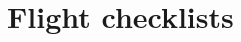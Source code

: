 \documentclass[Orbiter User Manual.tex]{subfiles}
\begin{document}
\section{Flight checklists}

\end{document}
